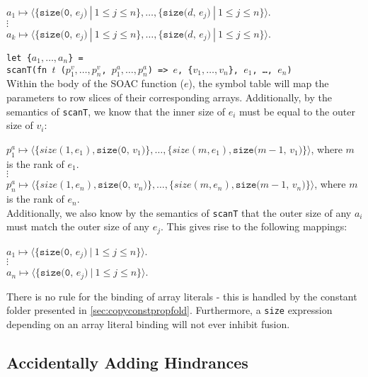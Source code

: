 \begin{description}
  $a_{1} \mapsto \langle\{\texttt{size(0, $e_{j}$)}\ |\ 1 \leq j \leq n\}, \ldots, \{\texttt{size($d$, $e_{j}$)}\ |\ 1 \leq j \leq n\}\rangle$. \\
  $\vdots$\\
  $a_{k} \mapsto \langle\{\texttt{size(0, $e_{j}$)}\ |\ 1 \leq j \leq n\}, \ldots, \{\texttt{size($d$, $e_{j}$)}\ |\ 1 \leq j \leq n\}\rangle$. \\

\item \texttt{let \{$a_{1},\ldots,a_{n}$\} =\\scanT(fn $t$ ($p^{v}_{1},\ldots,p^{v}_{n}$, $p^{a}_{1},\ldots,p^{a}_{n}$) => $e$, \{$v_{1},\ldots,v_{n}$\}, $e_{1}$, \ldots, $e_{n}$)} \hfill\\
  Within the body of the SOAC function ($e$), the symbol table will
  map the parameters to row slices of their corresponding arrays.
  Additionally, by the semantics of \texttt{scanT}, we know that the
  inner size of $e_{i}$ must be equal to the outer size of $v_{i}$:

  $p^{a}_{1} \mapsto \langle\{size(1, e_{1}), \texttt{size(0, $v_{1}$)}\}, \ldots, \{size(m, e_{1}), \texttt{size($m-1$, $v_{1}$)}\}\rangle$, where $m$ is the rank of $e_{1}$. \\
  $\vdots$\\
  $p^{a}_{n} \mapsto \langle\{size(1, e_{n}), \texttt{size(0, $v_{n}$)}\}, \ldots, \{size(m, e_{n}), \texttt{size($m-1$, $v_{n}$)}\}\rangle$, where $m$ is the rank of $e_{n}$. \\

  Additionally, we also know by the semantics of \texttt{scanT} that
  the outer size of any $a_{i}$ must match the outer size of any
  $e_{j}$.  This gives rise to the following mappings:

  $a_{1} \mapsto \langle\{\texttt{size(0, $e_{j}$)}\ |\ 1 \leq j \leq n\}\rangle$. \\
  $\vdots$\\
  $a_{n} \mapsto \langle\{\texttt{size(0, $e_{j}$)}\ |\ 1 \leq j \leq n\}\rangle$. \\
\end{description}

There is no rule for the binding of array literals - this is handled
by the constant folder presented in \cref{sec:copyconstpropfold}.
Furthermore, a \texttt{size} expression depending on an array literal
binding will not ever inhibit fusion.

\subsection{Accidentally Adding Hindrances}
\label{sec:accidentally-adding-hindrances}

